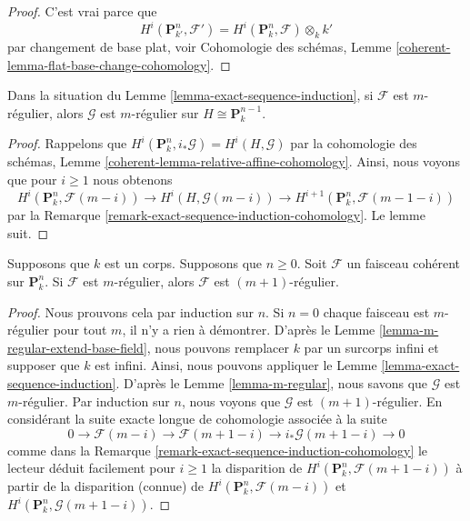 \begin{proof}
C'est vrai parce que
$$
H^i(\mathbf{P}^n_{k'}, \mathcal{F}') =
H^i(\mathbf{P}^n_k, \mathcal{F}) \otimes_k k'
$$
par changement de base plat, voir Cohomologie des
schémas, Lemme \ref{coherent-lemma-flat-base-change-cohomology}.
\end{proof}

\begin{lemma}
\label{lemma-m-regular}
Dans la situation du Lemme
\ref{lemma-exact-sequence-induction}, si $\mathcal{F}$ est $m$-régulier,
alors $\mathcal{G}$ est $m$-régulier sur $H \cong \mathbf{P}^{n - 1}_k$.
\end{lemma}

\begin{proof}
Rappelons que $H^i(\mathbf{P}^n_k, i_*\mathcal{G}) = H^i(H,
\mathcal{G})$ par la cohomologie des schémas, Lemme
\ref{coherent-lemma-relative-affine-cohomology}. Ainsi, nous voyons que pour $i \geq 1$ nous obtenons
$$
H^i(\mathbf{P}^n_k, \mathcal{F}(m - i)) \to
H^i(H, \mathcal{G}(m - i)) \to
H^{i + 1}(\mathbf{P}^n_k, \mathcal{F}(m - 1 - i))
$$
par la Remarque
\ref{remark-exact-sequence-induction-cohomology}. Le lemme suit.
\end{proof}

\begin{lemma}
\label{lemma-m-regular-up}
Supposons que $k$ est un corps. Supposons que $n
\geq 0$. Soit $\mathcal{F}$ un faisceau cohérent
sur $\mathbf{P}^n_k$. Si $\mathcal{F}$ est
$m$-régulier, alors $\mathcal{F}$ est $(m + 1)$-régulier.
\end{lemma}

\begin{proof}
Nous prouvons cela par induction sur $n$. Si $n = 0$ chaque
faisceau est $m$-régulier pour tout $m$, il n'y a rien à
démontrer. D'après le Lemme
\ref{lemma-m-regular-extend-base-field}, nous pouvons remplacer $k$ par
un surcorps infini et supposer que $k$ est infini. Ainsi, nous pouvons
appliquer le Lemme \ref{lemma-exact-sequence-induction}. D'après le Lemme
\ref{lemma-m-regular}, nous savons que $\mathcal{G}$ est $m$-régulier.
Par induction sur $n$, nous voyons que $\mathcal{G}$ est $(m +
1)$-régulier. En considérant la suite exacte longue de cohomologie associée à la suite
$$
0 \to \mathcal{F}(m - i) \to \mathcal{F}(m + 1 - i)
\to i_*\mathcal{G}(m + 1 - i) \to 0
$$
comme dans la Remarque
\ref{remark-exact-sequence-induction-cohomology} le lecteur déduit
facilement pour $i \geq 1$ la disparition de $H^i(\mathbf{P}^n_k,
\mathcal{F}(m + 1 - i))$ à partir de la disparition (connue) de
$H^i(\mathbf{P}^n_k, \mathcal{F}(m - i))$ et $H^i(\mathbf{P}^n_k, \mathcal{G}(m + 1 - i))$.
\end{proof}

